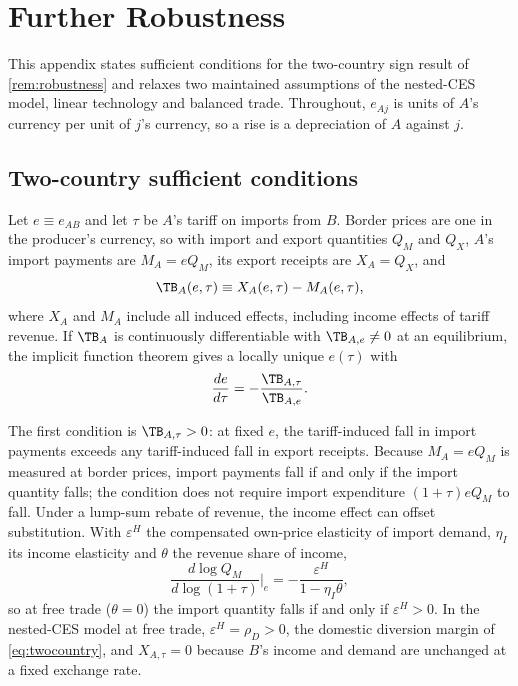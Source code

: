\section{Further Robustness}
\label{app:online}

This appendix states sufficient conditions for the two-country sign result of \cref{rem:robustness} and relaxes two maintained assumptions of the nested-CES model, linear technology and balanced trade. Throughout, $e_{Aj}$ is units of $A$'s currency per unit of $j$'s currency, so a rise is a depreciation of $A$ against $j$.

\subsection{Two-country sufficient conditions}
\label{app:online-twocountry}

Let $e\equiv e_{AB}$ and let $\tau$ be $A$'s tariff on imports from $B$. Border prices are one in the producer's currency, so with import and export quantities $Q_M$ and $Q_X$, $A$'s import payments are $M_A=eQ_M$, its export receipts are $X_A=Q_X$, and
\begin{equation*}
\TB_A(e,\tau)\equiv X_A(e,\tau)-M_A(e,\tau),
\end{equation*}
where $X_A$ and $M_A$ include all induced effects, including income effects of tariff revenue. If $\TB_A$ is continuously differentiable with $\TB_{A,e}\neq0$ at an equilibrium, the implicit function theorem gives a locally unique $e(\tau)$ with
\begin{equation*}
\frac{de}{d\tau}=-\frac{\TB_{A,\tau}}{\TB_{A,e}}.
\end{equation*}

The first condition is $\TB_{A,\tau}>0$: at fixed $e$, the tariff-induced fall in import payments exceeds any tariff-induced fall in export receipts. Because $M_A=eQ_M$ is measured at border prices, import payments fall if and only if the import quantity falls; the condition does not require import expenditure $(1+\tau)eQ_M$ to fall. Under a lump-sum rebate of revenue, the income effect can offset substitution. With $\varepsilon^H$ the compensated own-price elasticity of import demand, $\eta_I$ its income elasticity and $\theta$ the revenue share of income,
\begin{equation*}
\frac{d\log Q_M}{d\log(1+\tau)}\bigg|_e=-\frac{\varepsilon^H}{1-\eta_I\theta},
\end{equation*}
so at free trade ($\theta=0$) the import quantity falls if and only if $\varepsilon^H>0$. In the nested-CES model at free trade, $\varepsilon^H=\rho_D>0$, the domestic diversion margin of \cref{eq:twocountry}, and $X_{A,\tau}=0$ because $B$'s income and demand are unchanged at a fixed exchange rate.

